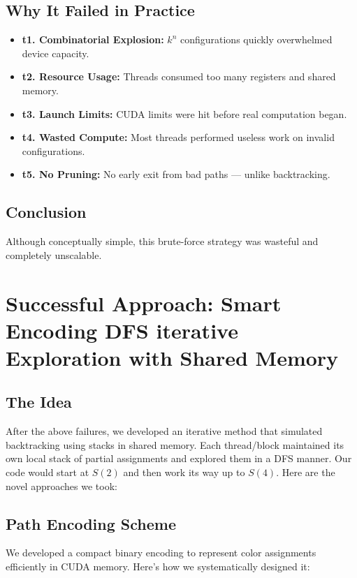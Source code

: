 \documentclass[12pt]{article}
\begin{document}
\subsection{Why It Failed in Practice}
\begin{itemize}
    \item \textbf{t1. Combinatorial Explosion:} \(k^n\) configurations quickly overwhelmed device capacity.
    \item \textbf{t2. Resource Usage:} Threads consumed too many registers and shared memory.
    \item \textbf{t3. Launch Limits:} CUDA limits were hit before real computation began.
    \item \textbf{t4. Wasted Compute:} Most threads performed useless work on invalid configurations.
    \item \textbf{t5. No Pruning:} No early exit from bad paths — unlike backtracking.
\end{itemize}

\subsection{Conclusion}
Although conceptually simple, this brute-force strategy was wasteful and completely unscalable.

\section{Successful Approach: Smart Encoding DFS iterative Exploration with Shared Memory}

\subsection{The Idea}
After the above failures, we developed an iterative method that simulated backtracking using stacks in shared memory. Each thread/block maintained its own local stack of partial assignments and explored them in a DFS manner. Our code would start at $S(2)$ and then work its way up to $S(4)$. Here are the novel approaches we took:

\subsection{Path Encoding Scheme}
We developed a compact binary encoding to represent color assignments efficiently in CUDA memory. Here's how we systematically designed it:
\end{document}
